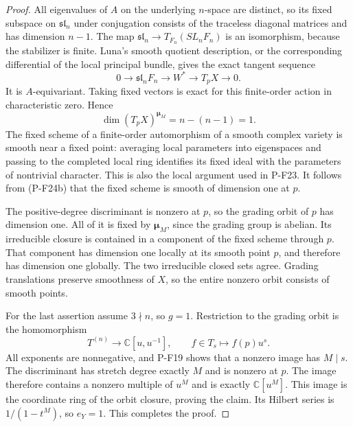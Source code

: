 \documentclass[11pt,a4paper]{article}
\begin{document}
\begin{proof}
All eigenvalues of $A$ on the underlying $n$-space are
distinct, so its fixed subspace on $\mathfrak{sl}_n$
under conjugation consists of the traceless diagonal
matrices and has dimension $n-1$. The map
$\mathfrak{sl}_n\to T_{F_n}(SL_nF_n)$ is an isomorphism,
because the stabilizer is finite. Luna's smooth quotient
description, or the corresponding differential of the
local principal bundle, gives the exact tangent sequence
\[
 0\longrightarrow\mathfrak{sl}_n F_n
 \longrightarrow W^*
 \longrightarrow T_pX\longrightarrow0.
\]
It is $A$-equivariant. Taking fixed vectors is exact for
this finite-order action in characteristic zero. Hence
\[
 \dim(T_pX)^{\boldsymbol\mu_M}=n-(n-1)=1.
 \tag{P-F24b}
\]
The fixed scheme of a finite-order automorphism of a
smooth complex variety is smooth near a fixed point:
averaging local parameters into eigenspaces and passing
to the completed local ring identifies its fixed ideal
with the parameters of nontrivial character. This is
also the local argument used in P-F23. It follows from
(P-F24b) that the fixed scheme is smooth of dimension one
at $p$.

The positive-degree discriminant is nonzero at $p$, so
the grading orbit of $p$ has dimension one. All of it
is fixed by $\boldsymbol\mu_M$, since the grading group
is abelian. Its irreducible closure is contained in a
component of the fixed scheme through $p$. That component
has dimension one locally at its smooth point $p$, and
therefore has dimension one globally. The two irreducible
closed sets agree. Grading translations preserve smoothness
of $X$, so the entire nonzero orbit consists of smooth
points.

For the last assertion assume $3\nmid n$, so $g=1$.
Restriction to the grading orbit is the homomorphism
\[
 T^{(n)}\longrightarrow\mathbb C[u,u^{-1}],\qquad
 f\in T_s\longmapsto f(p)u^s.
\]
All exponents are nonnegative, and P-F19 shows that a
nonzero image has $M\mid s$. The discriminant has stretch
degree exactly $M$ and is nonzero at $p$. The image therefore
contains a nonzero multiple of $u^M$ and is exactly
$\mathbb C[u^M]$. This image is the coordinate ring of
the orbit closure, proving the claim. Its Hilbert series is
$1/(1-t^M)$, so $e_Y=1$. This completes the proof.
\end{proof}
\end{document}
